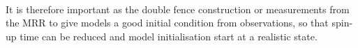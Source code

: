 \\
It is therefore important as the double fence construction or measurements from the MRR to give models a good initial condition from observations, so that spin-up time can be reduced and model initialisation start at a realistic state.


